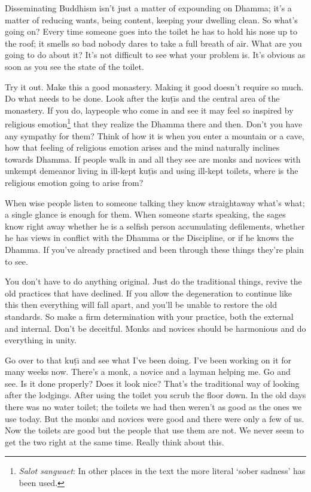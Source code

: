 Disseminating Buddhism isn't just a matter of expounding on Dhamma; it's a matter of reducing wants, being content, keeping your dwelling clean. So what's going on? Every time someone goes into the toilet he has to hold his nose up to the roof; it smells so bad nobody dares to take a full breath of air. What are you going to do about it? It's not difficult to see what your problem is. It's obvious as soon as you see the state of the toilet.

Try it out. Make this a good monastery. Making it good doesn't require so much. Do what needs to be done. Look after the ku\d{t}\={\i}s and the central area of the monastery. If you do, laypeople who come in and see it may feel so inspired by religious emotion\footnote{\textit{Salot sangwaet}: In other places in the text the more literal `sober sadness' has been used.} that they realize the Dhamma there and then. Don't you have any sympathy for them? Think of how it is when you enter a mountain or a cave, how that feeling of religious emotion arises and the mind naturally inclines towards Dhamma. If people walk in and all they see are monks and novices with unkempt demeanor living in ill-kept ku\d{t}\={\i}s and using ill-kept toilets, where is the religious emotion going to arise from?

When wise people listen to someone talking they know straightaway what's what; a single glance is enough for them. When someone starts speaking, the sages know right away whether he is a selfish person accumulating defilements, whether he has views in conflict with the Dhamma or the Discipline, or if he knows the Dhamma. If you've already practised and been through these things they're plain to see.

You don't have to do anything original. Just do the traditional things, revive the old practices that have declined. If you allow the degeneration to continue like this then everything will fall apart, and you'll be unable to restore the old standards. So make a firm determination with your practice, both the external and internal. Don't be deceitful. Monks and novices should be harmonious and do everything in unity.

Go over to that ku\d{t}\={\i} and see what I've been doing. I've been working on it for many weeks now. There's a monk, a novice and a layman helping me. Go and see. Is it done properly? Does it look nice? That's the traditional way of looking after the lodgings. After using the toilet you scrub the floor down. In the old days there was no water toilet; the toilets we had then weren't as good as the ones we use today. But the monks and novices were good and there were only a few of us. Now the toilets are good but the people that use them are not. We never seem to get the two right at the same time. Really think about this.


